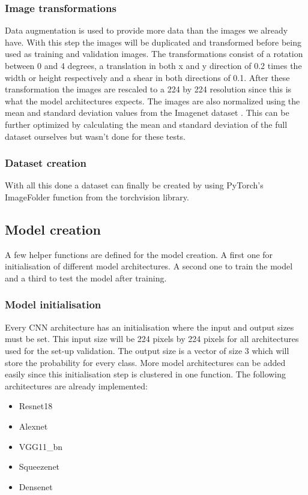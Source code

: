 	\subsubsection{Image transformations}
	Data augmentation is used to provide more data than the images we already have. With this step the images will be duplicated and transformed before being used as training and validation images. The transformations consist of a rotation between 0 and 4 degrees, a translation in both x and y direction of 0.2 times the width or height respectively and a shear in both directions of 0.1. After these transformation the images are rescaled to a 224 by 224 resolution since this is what the model architectures expects. The images are also normalized using the mean and standard deviation values from the Imagenet dataset \citep{imagenet_cvpr09}. This can be further optimized by calculating the mean and standard deviation of the full dataset ourselves but wasn't done for these tests.
	
	\subsubsection{Dataset creation}
	\label{sec:impl:do:dscreate}
	With all this done a dataset can finally be created by using PyTorch's ImageFolder function from the torchvision library. \citep{pytorch} 
	
	\subsection{Model creation}
		A few helper functions are defined for the model creation. A first one for initialisation of different model architectures. A second one to train the model and a third to test the model after training.
		
		\subsubsection{Model initialisation}
		\label{sec:impl:visionalgorithms:init}
			Every CNN architecture has an initialisation where the input and output sizes must be set. This input size will be 224 pixels by 224 pixels for all architectures used for the set-up validation. The output size is a vector of size 3 which will store the probability for every class. More model architectures can be added easily since this initialisation step is clustered in one function. The following architectures are already implemented:
			
			\begin{itemize}
				\item Resnet18
				\item Alexnet
				\item VGG11\_bn
				\item Squeezenet
				\item Densenet
			\end{itemize}
			
